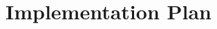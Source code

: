 \documentclass[../Main.tex]{subfiles}
\begin{document}
\section{Implementation Plan}
\label{chap:Implementation_Plan}

\biblio %
\end{document}

